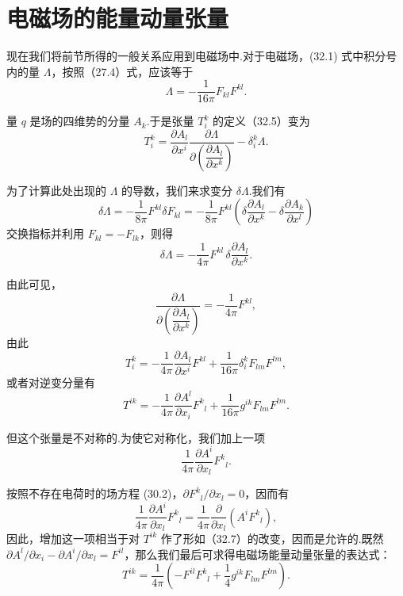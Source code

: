 \section{电磁场的能量动量张量}

现在我们将前节所得的一般关系应用到电磁场中.对于电磁场，(32.1)
式中积分号内的量 $\varLambda$，按照（27.4）式，应该等于
\begin{equation*}
  \varLambda=-\frac{1}{16\pi}F_{kl}F^{kl}.
\end{equation*}

量 $q$ 是场的四维势的分量 $A_k$.于是张量 $T_i^k$ 的定义（32.5）变为
\begin{equation*}
  T_i^k=\frac{\partial A_l}{\partial x^i}
  \frac{\partial\varLambda}{\partial\left(\dfrac{\partial A_l}{\partial x^k}\right)}
  -\delta_i^k\varLambda.
\end{equation*}

为了计算此处出现的 $\varLambda$ 的导数，我们来求变分 $\delta\varLambda$.我们有
\begin{equation*}
  \delta\varLambda=-\frac{1}{8\pi}F^{kl}\delta F_{kl}
  =-\frac{1}{8\pi}F^{kl}\left(\delta\frac{\partial A_l}{\partial x^k}
  -\delta\frac{\partial A_k}{\partial x^l}\right)
\end{equation*}
交换指标并利用 $F_{kl}=-F_{lk}$，则得
\begin{equation*}
  \delta\varLambda=-\frac{1}{4\pi}F^{kl}\,
  \delta\frac{\partial A_l}{\partial x^k}.
\end{equation*}

由此可见，
\begin{equation*}
  \frac{\partial\varLambda}
  {\partial\left(\dfrac{\partial A_l}{\partial x^k}\right)}
  =-\frac{1}{4\pi}F^{kl},
\end{equation*}
由此
\begin{equation*}
  T_i^k=-\frac{1}{4\pi}\frac{\partial A_l}{\partial x^i}F^{kl}
  +\frac{1}{16\pi}\delta_i^kF_{lm}F^{lm},
\end{equation*}
或者对逆变分量有
\begin{equation*}
  T^{ik}=-\frac{1}{4\pi}\frac{\partial A^l}{\partial x_i}F^k{}_l
  +\frac{1}{16\pi}g^{ik}F_{lm}F^{lm}.
\end{equation*}

但这个张量是不对称的.为使它对称化，我们加上一项
\begin{equation*}
  \frac{1}{4\pi}\frac{\partial A^i}{\partial x_l}F^k{}_l.
\end{equation*}

按照不存在电荷时的场方程 (30.2)，$\partial F^k{}_l/\partial x_l=0$，因而有
\begin{equation*}
  \frac{1}{4\pi}\frac{\partial A^i}{\partial x_l}F^k{}_l
  =\frac{1}{4\pi}\frac{\partial}{\partial x_l}
  \left(A^iF^k{}_l\right),
\end{equation*}
因此，增加这一项相当于对 $T^{ik}$
作了形如（32.7）的改变，因而是允许的.既然
$\partial A^l/\partial x_i-\partial A^i/\partial x_l=F^{il}$，那么我们最后可求得电磁场能量动量张量的表达式：
\begin{equation}
  T^{ik}=\frac{1}{4\pi}\left(-F^{il}F^k{}_l
  +\frac{1}{4}g^{ik}F_{lm}F^{lm}\right).
\end{equation}

